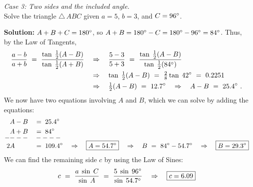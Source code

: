 \begin{exmp}\label{exmp:case3tangent}
\noindent \emph{Case 3: Two sides and the included angle.}\\Solve the triangle $\triangle\,ABC$ given
 $a =5$, $b = 3$, and $C = 96^\circ$.\vspace{1mm}
 \par\noindent\textbf{Solution:} $A + B + C = 180^\circ$, so $A + B = 180^\circ - C =
 180^\circ - 96^\circ = 84^\circ$. Thus, by the Law of Tangents,
 \begin{align*}
  \frac{a-b}{a+b} ~=~ \frac{\tan\;\frac{1}{2}(A-B)}{\tan\;\frac{1}{2}(A+B)} \quad&\Rightarrow\quad
   \frac{5-3}{5+3} ~=~ \frac{\tan\;\frac{1}{2}(A-B)}{\tan\;\frac{1}{2}(84^\circ)}\\
  &\Rightarrow\quad \tan\;\tfrac{1}{2}(A-B) ~=~ \tfrac{2}{8}\tan\;42^\circ ~=~ 0.2251\\
  &\Rightarrow\quad \tfrac{1}{2}(A-B) ~=~ 12.7^\circ \quad\Rightarrow\quad A-B ~=~ 25.4^\circ ~.
 \end{align*}
 We now have two equations involving $A$ and $B$, which we can solve by adding the equations:
 \begin{alignat*}{3}
  A &- B &&=\; 25.4\Degrees\\
  A &+ B &&=\; 84\Degrees\phantom{4\Degrees}\\[-2mm]
  --&--&&----\\[-2mm]
  2A &\phantom{+} &&=\; 109.4\Degrees \quad\Rightarrow\quad \boxed{A = 54.7\Degrees}
  \quad\Rightarrow\quad B ~=~ 84\Degrees - 54.7\Degrees \quad\Rightarrow\quad
  \boxed{B = 29.3\Degrees}
 \end{alignat*}
 We can find the remaining side $c$ by using the Law of Sines:
 \begin{displaymath}
  c ~=~ \frac{a\;\sin\;C}{\sin\;A} ~=~ \frac{5\;\sin\;96^\circ}{\sin\;54.7^\circ}
   \quad\Rightarrow\quad \boxed{c = 6.09}
 \end{displaymath}
\end{exmp}\vspace{-2mm}
